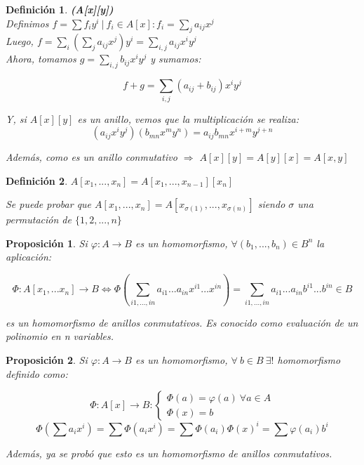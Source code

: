 \documentclass[11pt, a4paper, titlepage]{article}
\theoremstyle{theorem-style}
\newtheorem*{nprop}{Proposición}
\theoremstyle{definition-style}
\newtheorem*{ndef}{Definición}
\theoremstyle{remark-style}
\theoremstyle{example-style}
\begin{document}
\begin{ndef} \textbf{(A[x][y])}
\hfill \\
Definimos $f=\sum f_i y^i\ |\ f_i \in A[x] : f_i = \sum_j a_{ij}x^j$\\
Luego, $f = \sum_i (\sum_j a_{ij}x^j)y^i = \sum_{i,j} a_{ij}x^iy^j$\\

Ahora, tomamos $g =\sum_{i,j} b_{ij}x^iy^j$ y sumamos:

\[
f+g = \sum_{i,j}(a_{ij}+b_{ij})x^iy^j
\]

Y, si $A[x][y]$ es un anillo, vemos que la multiplicación se realiza:
\[
(a_{ij}x^iy^j)(b_{mn}x^my^n) = a_{ij}b_{mn} x^{i+m}y^{j+n}
\]


Además, como es un anillo conmutativo $\Rightarrow$ $A[x][y] = A[y][x] = A[x,y]$

	
\end{ndef}


\begin{ndef}
	$A[x_1,...,x_n] = A[x_1,...,x_{n-1}][x_n]$

Se puede probar que $A[x_1,...,x_n] = A[x_{\sigma(1)},...,x_{\sigma(n)}]$ siendo $\sigma$ una permutación de $\{1,2,...,n \}$
\end{ndef}

\newpage

\begin{nprop}
	
Si $\varphi :A \to B$ es un homomorfismo, $\forall(b_1,...,b_n) \in B^n$ la aplicación:

\[
\Phi:A[x_1,...x_n] \to B \iff \Phi(\sum_{i1,...,in}a_{i1}...a_{in}x^{i1}... x^{in}) = \sum_{i1,...,in}a_{i1}...a_{in}b^{i1}... b^{in} \in B
\]

es un homomorfismo de anillos conmutativos. Es conocido como evaluación de un polinomio en n variables.

\end{nprop}



\begin{nprop}
	Si $\varphi:A \to B$ es un homomorfismo, $\forall\  b \in B\  \exists ! $ homomorfismo definido como:
	
\[
\Phi:A[x] \to B : \begin{cases}
	\Phi(a) = \varphi(a)\ \forall a \in A \\
	\Phi(x) = b 
\end{cases}
\]
\[
\Phi(\sum a_i x^i) = \sum \Phi(a_i x^i) =  \sum \Phi(a_i) \Phi(x)^i = \sum \varphi(a_i) b^i
\]

Además, ya se probó que esto es un homomorfismo de anillos conmutativos.

\end{nprop}
\end{document}
